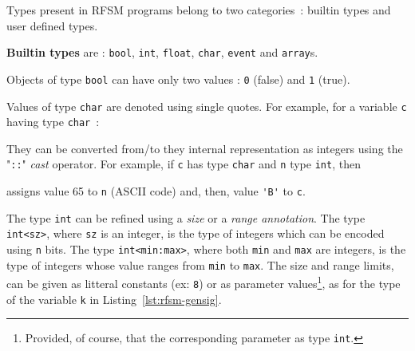 Types present in RFSM programs belong to two categories~: builtin types and user defined types.

\medskip
\textbf{Builtin types} are : \texttt{bool}, \texttt{int}, \texttt{float}, \texttt{char}, \texttt{event} and
\texttt{array}s.

\medskip
\step Objects of type \texttt{bool} can have only two values : \texttt{0} (false) and \texttt{1} (true).

\step Values of type \texttt{char} are
denoted using single quotes. For example, for a variable \verb|c| having type \verb|char|~:
\begin{center}
\end{center}
They can be converted from/to they internal representation as integers using the "\verb|::|" \emph{cast}
operator. For example, if \verb|c| has type \verb|char| and \verb|n| type \verb|int|, then 
\begin{center}
\end{center}
assigns value 65 to \verb|n| (ASCII code) and, then, value \verb|'B'| to \verb|c|.


\medskip
\step The type \texttt{int} can be refined using a \emph{size} or a \emph{range annotation}. The
type \verb|int<sz>|, where \verb|sz| is an integer, is the type of integers which can be encoded using
\verb|n| bits. The type \verb|int<min:max>|, where both \verb|min| and \verb|max| are integers, is
the type of integers whose value ranges from \verb|min| to \verb|max|. The size and range limits,
can be given as litteral constants (ex: \verb|8|) or as parameter values\footnote{Provided, of
  course, that the corresponding parameter as type \texttt{int}.}, as for the type of the
variable \texttt{k} in Listing~\ref{lst:rfsm-gensig}.

